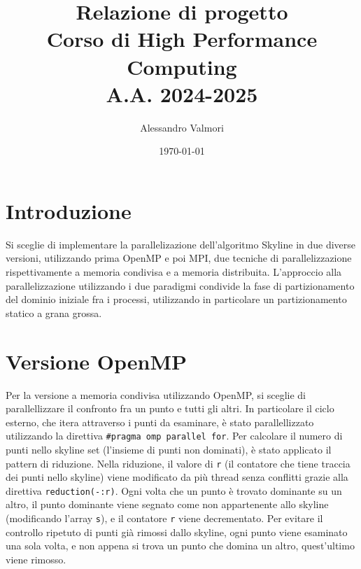 \documentclass[letterpaper,11pt,leqno]{article}
\title{\vspace{-1cm} Relazione di progetto \\ Corso di High Performance Computing \\ A.A. 2024-2025}
\author{Alessandro Valmori}
\date{\vspace{-0.3cm} \today}  %
\begin{document}
\begingroup\let\newpage\relax\maketitle\endgroup  %

\vspace{-1cm}  %





\section{Introduzione}\label{s:introduction}
 
Si sceglie di implementare la parallelizazione dell'algoritmo Skyline in due diverse versioni, utilizzando prima OpenMP e poi MPI, due tecniche di parallelizzazione rispettivamente a memoria condivisa e a memoria distribuita. L'approccio alla parallelizzazione utilizzando i due paradigmi condivide la fase di partizionamento del dominio iniziale fra i processi, utilizzando in particolare un partizionamento statico a grana grossa. 



\section{Versione OpenMP}\label{s:section}


Per la versione a memoria condivisa utilizzando OpenMP, si sceglie di parallellizzare il confronto fra un punto e tutti gli altri. In particolare il ciclo esterno, che itera attraverso i punti da esaminare, è stato parallellizzato utilizzando la direttiva \texttt{\#pragma omp parallel for}. Per calcolare il numero di punti nello skyline set (l'insieme di punti non dominati), è stato applicato il pattern di riduzione. Nella riduzione, il valore di \texttt{r} (il contatore che tiene traccia dei punti nello skyline) viene modificato da più thread senza conflitti grazie alla direttiva \texttt{reduction(-:r)}. Ogni volta che un punto è trovato dominante su un altro, il punto dominante viene segnato come non appartenente allo skyline (modificando l'array \texttt{s}), e il contatore \texttt{r} viene decrementato. Per evitare il controllo ripetuto di punti già rimossi dallo skyline, ogni punto viene esaminato una sola volta, e non appena si trova un punto che domina un altro, quest'ultimo viene rimosso.
\end{document}

